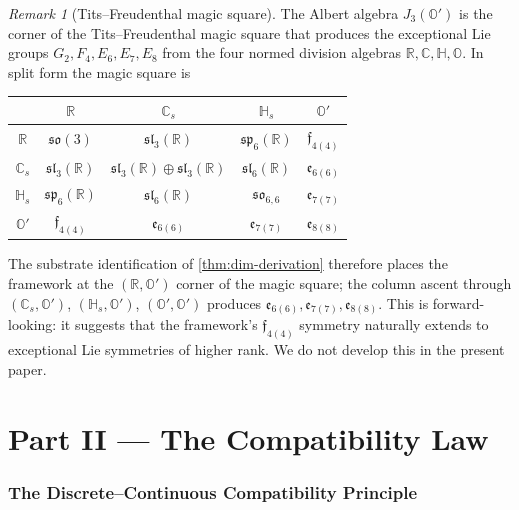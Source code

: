 \documentclass[11pt,a4paper]{article}
\theoremstyle{plain}
\theoremstyle{definition}
\theoremstyle{remark}
\newtheorem{remark}[theorem]{Remark}
\numberwithin{equation}{section}
\providecommand{\R}{\mathbb{R}}
\providecommand{\C}{\mathbb{C}}
\providecommand{\HH}{\mathbb{H}}
\providecommand{\OO}{\mathbb{O}}
\providecommand{\Os}{\mathbb{O}'}
\providecommand{\fk}[1]{\mathfrak{#1}}
\providecommand{\slgo}{\mathfrak{sl}}
\providecommand{\sogo}{\mathfrak{so}}
\providecommand{\spgo}{\mathfrak{sp}}
\begin{document}
\begin{remark}[Tits--Freudenthal magic square]
\label{rmk:magic-square}
The Albert algebra $J_3(\Os)$ is the corner of the
Tits--Freudenthal magic square \cite{freudenthal1964,tits1966,baez-octonions}
that produces the exceptional Lie groups
$G_2, F_4, E_6, E_7, E_8$ from the four normed division algebras
$\R, \C, \HH, \OO$.  In split form the magic square is
\begin{center}
\begin{tabular}{c|cccc}
              & $\R$  & $\C_s$ & $\HH_s$ & $\Os$ \\
\hline
$\R$          & $\sogo(3)$ & $\slgo_3(\R)$ & $\spgo_6(\R)$ & $\fk{f}_{4(4)}$ \\
$\C_s$        & $\slgo_3(\R)$ & $\slgo_3(\R)\oplus\slgo_3(\R)$ & $\slgo_6(\R)$ & $\fk{e}_{6(6)}$ \\
$\HH_s$       & $\spgo_6(\R)$ & $\slgo_6(\R)$ & $\sogo_{6,6}$ & $\fk{e}_{7(7)}$ \\
$\Os$         & $\fk{f}_{4(4)}$ & $\fk{e}_{6(6)}$ & $\fk{e}_{7(7)}$ & $\fk{e}_{8(8)}$ \\
\end{tabular}
\end{center}
The substrate identification of \cref{thm:dim-derivation} therefore
places the framework at the $(\R, \Os)$ corner of the magic
square; the column ascent through $(\C_s, \Os)$, $(\HH_s, \Os)$,
$(\Os, \Os)$ produces $\fk{e}_{6(6)}, \fk{e}_{7(7)},
\fk{e}_{8(8)}$.  This is forward-looking: it suggests that the
framework's $\fk{f}_{4(4)}$ symmetry naturally extends to
exceptional Lie symmetries of higher rank.  We do not develop
this in the present paper.
\end{remark}

\part*{Part II --- The Compatibility Law}

\section{The Discrete--Continuous Compatibility Principle}
\label{sec:compatibility-principle}
\end{document}
